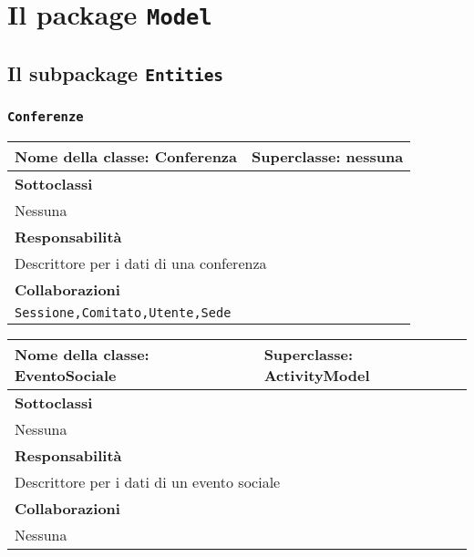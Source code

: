 \section{Il package \texttt{Model}}
\subsection{Il subpackage \texttt{Entities}}
\subsubsection{\texttt{Conferenze}}
\begin{table}[h!]
\centering
\begin{tabular}{|l|l|}
\hline
\textbf{Nome della classe:} Conferenza & \textbf{Superclasse}: nessuna \\ \hline
\multicolumn{2}{|l|}{\textbf{Sottoclassi}}\\
\multicolumn{2}{|l|}{Nessuna} \\ \hline
\multicolumn{2}{|l|}{\textbf{Responsabilità}}\\
\multicolumn{2}{|l|}{Descrittore per i dati di una conferenza} \\ \hline
\multicolumn{2}{|l|}{\textbf{Collaborazioni}}\\
\multicolumn{2}{|l|}{\texttt{Sessione,Comitato,Utente,Sede}} \\ \hline
\end{tabular}
\end{table}
\begin{table}[h!]
\centering
\begin{tabular}{|l|l|}
\hline
\textbf{Nome della classe:} EventoSociale & \textbf{Superclasse}: ActivityModel \\ \hline
\multicolumn{2}{|l|}{\textbf{Sottoclassi}}\\
\multicolumn{2}{|l|}{Nessuna} \\ \hline
\multicolumn{2}{|l|}{\textbf{Responsabilità}}\\
\multicolumn{2}{|l|}{Descrittore per i dati di un evento sociale} \\ \hline
\multicolumn{2}{|l|}{\textbf{Collaborazioni}}\\
\multicolumn{2}{|l|}{Nessuna} \\ \hline
\end{tabular}
\end{table}

